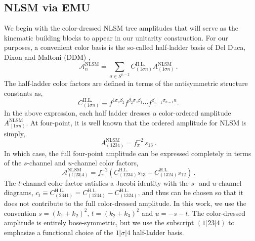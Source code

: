 \documentclass[12pt,letter]{article}
\newcommand{\cHL}[0]{C^{\text{H.L.}}}
\def\be{\begin{equation}}
\def\ee{\end{equation}}
\begin{document}
\subsection{NLSM via EMU}\label{sec:NLSMU}

We begin with the color-dressed NLSM tree amplitudes that will serve as the kinematic building blocks to appear in our unitarity construction. For our purposes, a convenient color basis is the so-called half-ladder basis of Del Duca, Dixon and Maltoni (DDM) \cite{DixonMaltoni},
\begin{equation}
\mathcal{A}^{\text{NLSM}}_n = \sum_{\sigma \in S^{n-2}}\cHL_{(1\sigma n)} A^{\text{NLSM}}_{(1\sigma n)}\,.
\end{equation}
The half-ladder color factors are defined in terms of the antisymmetric structure constants as, 
\be
\cHL_{(1\sigma n)} \equiv f^{1\sigma_2 \beta_2}f^{\beta_2 \sigma_3 \beta_3} \cdots f^{\beta_{n-1}\sigma_{n-1}n}.
\ee 
In the above expression, each half ladder dresses a color-ordered amplitude $A^{\text{NLSM}}_{(1\sigma n)}$. At four-point, it is well known that the ordered amplitude for NLSM is simply, 
\begin{equation}
A^{\text{NLSM}}_{(1234)} = f_\pi^{-2} \,s_{13}\,.
\end{equation}
In which case, the full four-point amplitude can be expressed completely in terms of the $s$-channel and $u$-channel color factors, 
\be\label{eq:NLSMamp} 
\mathcal{A}^{\text{NLSM}}_{(1|23|4)} = f_\pi^{-2}\left(\cHL_{(1234)} s_{13}+\cHL_{(1324)}s_{12}\right)\,.
\ee
The $t$-channel color factor satisfies a Jacobi identity with the $s$- and $u$-channel diagrams, $c_t \equiv\cHL_{(2341)} =\cHL_{(1234)}-\cHL_{(1324)}$, and thus can be chosen so that it does not contribute to the full color-dressed amplitude. In this work, we use the convention $s=(k_1+k_2)^2$, $t=(k_2+k_3)^2$ and $u=-s-t$.  The color-dressed amplitude is entirely bose-symmetric, but we use the subscript $(1|23|4)$ to emphasize a functional choice of the $1|\sigma|4$ half-ladder basis.
\end{document}
